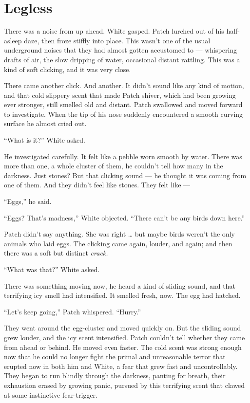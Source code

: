 \documentclass[ebook,oneside,openany,17pt]{memoir}
\newenvironment{tolerant}[1]{%
  \par\tolerance=#1\relax
}{%
  \par
}
\renewcommand{\thechapter}{\Roman{chapter}}
\newcounter{sections}
\newcommand{\sections}[1]{%
  \section*{#1}
  \addtocounter{sections}{1}%
  \pdfbookmark[1]{#1}{section.\thechapter.\thesections}}
\begin{document}

\sections{Legless}

There was a noise from up ahead. White gasped. Patch lurched out of
his half-asleep daze, then froze stiffly into place. This wasn’t one
of the usual underground noises that they had almost gotten accustomed
to — whispering drafts of air, the slow dripping of water, occasional
distant rattling. This was a kind of soft clicking, and it was very
close.

There came another click. And another. It didn’t sound like any kind
of motion, and that cold slippery scent that made Patch shiver, which
had been growing ever stronger, still smelled old and distant. Patch
swallowed and moved forward to investigate. When the tip of his nose
suddenly encountered a smooth curving surface he almost cried out.

“What is it?” White asked.

\begin{tolerant}{500}
He investigated carefully. It felt like a pebble worn smooth by
water. There was more than one, a whole cluster of them, he couldn’t
tell how many in the darkness. Just stones? But that clicking sound —
he thought it was coming from one of them. And they didn’t feel like
stones. They felt like —
\end{tolerant}

“Eggs,” he said.

“Eggs? That’s madness,” White objected. “There can’t be any birds down
here.”

Patch didn’t say anything. She was right … but maybe birds weren’t the
only animals who laid eggs. The clicking came again, louder, and
again; and then there was a soft but distinct \emph{crack.}

“What was that?” White asked.

There was something moving now, he heard a kind of sliding sound, and
that terrifying icy smell had intensified. It smelled fresh, now. The
egg had hatched.

“Let’s keep going,” Patch whispered. “Hurry.”

\begin{tolerant}{1000}
They went around the egg-cluster and moved quickly on. But the sliding
sound grew louder, and the icy scent intensified. Patch couldn’t tell
whether they came from ahead or behind. He moved even faster. The cold
scent was strong enough now that he could no longer fight the primal
and unreasonable terror that erupted now in both him and White, a fear
that grew fast and uncontrollably. They began to run blindly through
the darkness, panting for breath, their exhaustion erased by growing
panic, pursued by this terrifying scent that clawed at some
instinctive fear-trigger.
\end{tolerant}
\end{document}
